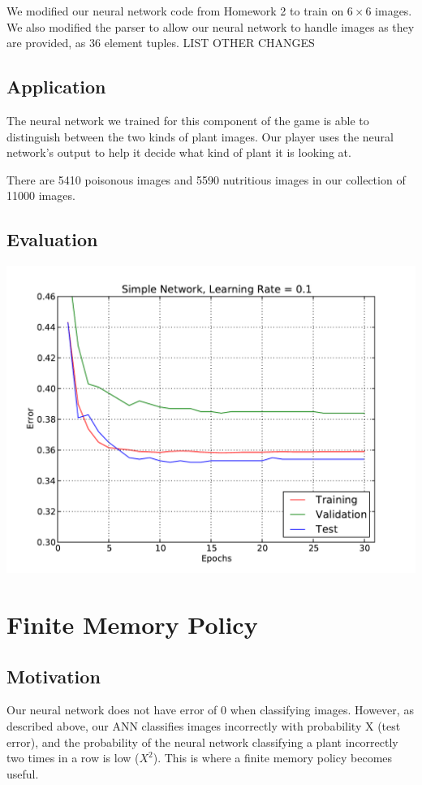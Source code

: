 \documentclass[solution, letterpaper]{cs121}
\begin{document}
We modified our neural network code from Homework 2 to train on $6 \times 6$ images. We also modified the parser to allow our neural network to handle images as they are provided, as 36 element tuples. LIST OTHER CHANGES

\subsection{Application}
\hspace{4mm} The neural network we trained for this component of the game is able to distinguish between the two kinds of plant images. Our player uses the neural network's output to help it decide what kind of plant it is looking at.

There are 5410 poisonous images and 5590 nutritious images in our collection of 11000 images.

\subsection{Evaluation}
\begin{center}
\includegraphics[scale=0.8]{source/simple-network-alpha-0_1.pdf}
\end{center}

\section{Finite Memory Policy}
\subsection{Motivation}
\hspace{4mm} Our neural network does not have error of 0 when classifying images. However, as described above, our ANN classifies images incorrectly with probability X (test error), and the probability of the neural network classifying a plant incorrectly two times in a row is low ($X^2$). This is where a finite memory policy becomes useful.
\end{document}
